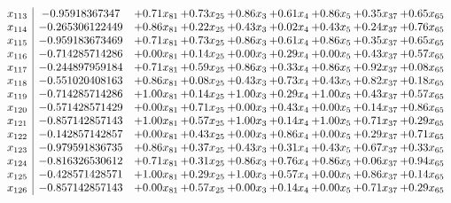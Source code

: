 \documentclass[8pt]{article}
\begin{document}
\[\begin{array}{c| c c@{\hskip 2pt} c@{\hskip 2pt} c@{\hskip 2pt} c@{\hskip 2pt} c@{\hskip 2pt} c@{\hskip 2pt} c@{\hskip 2pt} }
 x_{113}   &  -0.95918367347 & +  0.71 x_{81} & +  0.73 x_{25} & +  0.86 x_{3} & +  0.61 x_{4} & +  0.86 x_{5} & +  0.35 x_{37} & +  0.65 x_{65}\\
 x_{114}   &  -0.265306122449 & +  0.86 x_{81} & +  0.22 x_{25} & +  0.43 x_{3} & +  0.02 x_{4} & +  0.43 x_{5} & +  0.24 x_{37} & +  0.76 x_{65}\\
 x_{115}   &  -0.959183673469 & +  0.71 x_{81} & +  0.73 x_{25} & +  0.86 x_{3} & +  0.61 x_{4} & +  0.86 x_{5} & +  0.35 x_{37} & +  0.65 x_{65}\\
 x_{116}   &  -0.714285714286 & +  0.00 x_{81} & +  0.14 x_{25} & +  0.00 x_{3} & +  0.29 x_{4} & +  0.00 x_{5} & +  0.43 x_{37} & +  0.57 x_{65}\\
 x_{117}   &  -0.244897959184 & +  0.71 x_{81} & +  0.59 x_{25} & +  0.86 x_{3} & +  0.33 x_{4} & +  0.86 x_{5} & +  0.92 x_{37} & +  0.08 x_{65}\\
 x_{118}   &  -0.551020408163 & +  0.86 x_{81} & +  0.08 x_{25} & +  0.43 x_{3} & +  0.73 x_{4} & +  0.43 x_{5} & +  0.82 x_{37} & +  0.18 x_{65}\\
 x_{119}   &  -0.714285714286 & +  1.00 x_{81} & +  0.14 x_{25} & +  1.00 x_{3} & +  0.29 x_{4} & +  1.00 x_{5} & +  0.43 x_{37} & +  0.57 x_{65}\\
 x_{120}   &  -0.571428571429 & +  0.00 x_{81} & +  0.71 x_{25} & +  0.00 x_{3} & +  0.43 x_{4} & +  0.00 x_{5} & +  0.14 x_{37} & +  0.86 x_{65}\\
 x_{121}   &  -0.857142857143 & +  1.00 x_{81} & +  0.57 x_{25} & +  1.00 x_{3} & +  0.14 x_{4} & +  1.00 x_{5} & +  0.71 x_{37} & +  0.29 x_{65}\\
 x_{122}   &  -0.142857142857 & +  0.00 x_{81} & +  0.43 x_{25} & +  0.00 x_{3} & +  0.86 x_{4} & +  0.00 x_{5} & +  0.29 x_{37} & +  0.71 x_{65}\\
 x_{123}   &  -0.979591836735 & +  0.86 x_{81} & +  0.37 x_{25} & +  0.43 x_{3} & +  0.31 x_{4} & +  0.43 x_{5} & +  0.67 x_{37} & +  0.33 x_{65}\\
 x_{124}   &  -0.816326530612 & +  0.71 x_{81} & +  0.31 x_{25} & +  0.86 x_{3} & +  0.76 x_{4} & +  0.86 x_{5} & +  0.06 x_{37} & +  0.94 x_{65}\\
 x_{125}   &  -0.428571428571 & +  1.00 x_{81} & +  0.29 x_{25} & +  1.00 x_{3} & +  0.57 x_{4} & +  0.00 x_{5} & +  0.86 x_{37} & +  0.14 x_{65}\\
 x_{126}   &  -0.857142857143 & +  0.00 x_{81} & +  0.57 x_{25} & +  0.00 x_{3} & +  0.14 x_{4} & +  0.00 x_{5} & +  0.71 x_{37} & +  0.29 x_{65}\\

\end{array}\]
\end{document}
